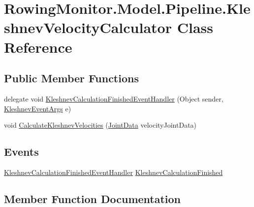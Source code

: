 \hypertarget{class_rowing_monitor_1_1_model_1_1_pipeline_1_1_kleshnev_velocity_calculator}{}\section{Rowing\+Monitor.\+Model.\+Pipeline.\+Kleshnev\+Velocity\+Calculator Class Reference}
\label{class_rowing_monitor_1_1_model_1_1_pipeline_1_1_kleshnev_velocity_calculator}
\subsection*{Public Member Functions}
\begin{DoxyCompactItemize}
\item 
delegate void \hyperlink{class_rowing_monitor_1_1_model_1_1_pipeline_1_1_kleshnev_velocity_calculator_aa8c251dc416d32f364bf138f4abeada7}{Kleshnev\+Calculation\+Finished\+Event\+Handler} (Object sender, \hyperlink{class_rowing_monitor_1_1_model_1_1_kleshnev_event_args}{Kleshnev\+Event\+Args} e)
\item 
void \hyperlink{class_rowing_monitor_1_1_model_1_1_pipeline_1_1_kleshnev_velocity_calculator_a69abee7723f70d572cc9ce6cd026c9fd}{Calculate\+Kleshnev\+Velocities} (\hyperlink{struct_rowing_monitor_1_1_model_1_1_util_1_1_joint_data}{Joint\+Data} velocity\+Joint\+Data)
\end{DoxyCompactItemize}
\subsection*{Events}
\begin{DoxyCompactItemize}
\item 
\hyperlink{class_rowing_monitor_1_1_model_1_1_pipeline_1_1_kleshnev_velocity_calculator_aa8c251dc416d32f364bf138f4abeada7}{Kleshnev\+Calculation\+Finished\+Event\+Handler} \hyperlink{class_rowing_monitor_1_1_model_1_1_pipeline_1_1_kleshnev_velocity_calculator_afc60a4e7b76e1bfd9c12b5aacda05a51}{Kleshnev\+Calculation\+Finished}
\end{DoxyCompactItemize}


\subsection{Member Function Documentation}
\mbox{\label{class_rowing_monitor_1_1_model_1_1_pipeline_1_1_kleshnev_velocity_calculator_a69abee7723f70d572cc9ce6cd026c9fd}} 
